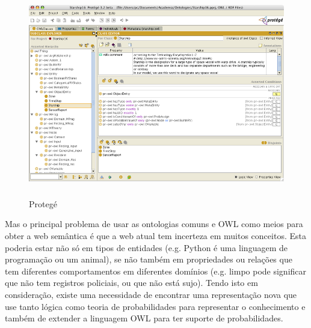 \begin{figure}[h]
	\centering
	\includegraphics[height=9cm]{./images/protege}
	\caption{Protegé}
	\label{fig:protege}
\end{figure}

Mas o principal problema de usar as ontologias comuns e OWL como meios para obter a web semântica é que a web atual tem incerteza em muitos conceitos. Esta poderia estar não só em tipos de entidades (e.g. Python é uma linguagem de programação ou um animal), se não também em propriedades ou relações que tem diferentes comportamentos em diferentes domínios (e.g. limpo pode significar que não tem registros policiais, ou que não está sujo). Tendo isto em consideração, existe uma necessidade de encontrar uma representação nova que use tanto lógica como teoria de probabilidades para representar o conhecimento e também de extender a linguagem OWL para ter suporte de probabilidades.